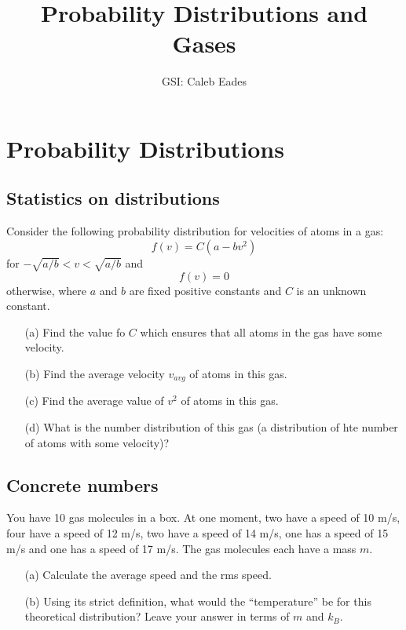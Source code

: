 \documentclass{article}
\begin{document}
	
\title{Probability Distributions and Gases}
\author{GSI: Caleb Eades}
\maketitle

\section{Probability Distributions}

\subsection{Statistics on distributions}

Consider the following probability distribution for velocities of atoms in a gas:
\begin{equation}
f(v) = C(a-bv^2)
\end{equation}
for $-\sqrt{a/b} < v < \sqrt{a/b}$ and
\begin{equation}
f(v) = 0
\end{equation}
otherwise, where $a$ and $b$ are fixed positive constants and $C$ is an unknown constant.
\begin{itemize}
	\item[(a)] Find the value fo $C$ which ensures that all atoms in the gas have some velocity.
	\item[(b)] Find the average velocity $v_{avg}$ of atoms in this gas.
	\item[(c)] Find the average value of $v^2$ of atoms in this gas.
	\item[(d)] What is the number distribution of this gas (a distribution of hte number of atoms with some velocity)?
\end{itemize}

\subsection{Concrete numbers}

You have 10 gas molecules in a box. At one moment, two have a speed of 10 m/s, four have a speed of 12 m/s, two have a speed of 14 m/s, one has a speed of 15 m/s and one has a speed of 17 m/s. The gas molecules each have a mass $m$.
\begin{itemize}
	\item[(a)] Calculate the average speed and the rms speed.
	\item[(b)] Using its strict definition, what would the ``temperature'' be for this theoretical distribution? Leave your answer in terms of $m$ and $k_B$.
\end{itemize}
\end{document}
